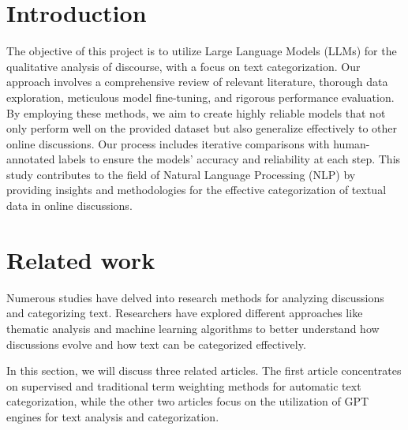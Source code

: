 \documentclass[fleqn,moreauthors,10pt]{ds_report}
\affiliation{\textit{Advisors: Slavko Žitnik}}
\begin{document}
\flushbottom 

\maketitle 

\thispagestyle{empty} 


\section*{Introduction}
The objective of this project is to utilize Large Language Models (LLMs) for the qualitative analysis of discourse, with a focus on text categorization. Our approach involves a comprehensive review of relevant literature, thorough data exploration, meticulous model fine-tuning, and rigorous performance evaluation. By employing these methods, we aim to create highly reliable models that not only perform well on the provided dataset but also generalize effectively to other online discussions. Our process includes iterative comparisons with human-annotated labels to ensure the models' accuracy and reliability at each step. This study contributes to the field of Natural Language Processing (NLP) by providing insights and methodologies for the effective categorization of textual data in online discussions.

\section*{Related work}

Numerous studies have delved into research methods for analyzing discussions and categorizing text. Researchers have explored different approaches like thematic analysis and machine learning algorithms to better understand how discussions evolve and how text can be categorized effectively.

In this section, we will discuss three related articles. The first article concentrates on supervised and traditional term weighting methods for automatic text categorization, while the other two articles focus on the utilization of GPT engines for text analysis and categorization.
\end{document}

